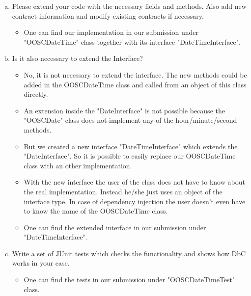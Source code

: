 \documentclass[a4paper,12pt,oneside]{scrreprt}
\begin{document}
\begin{enumerate}[a)]
	\item Please extend your code with the necessary fields and methods. Also add new contract information and modify existing contracts if necessary.

		\begin{itemize}
			\item One can find our implementation in our submission under "OOSCDateTime" class together with its interface "DateTimeInterface".
		\end{itemize}

	\item Is it also necessary to extend the Interface?

		\begin{itemize}
            \item No, it is not necessary to extend the interface. The new methods could be added in the OOSCDateTime class and called from an object of this class directly.
            \item An extension inside the "DateInterface" is not possible because the "OOSCDate" class does not implement any of the hour/minute/second-methods.
			\item But we created a new interface "DateTimeInterface" which extends the "DateInterface". So it is possible to easily replace our OOSCDateTime class with an other implementation. 
            \item With the new interface the user of the class does not have to know about the real implementation. Instead he/she just uses an object of the interface type. In case of dependency injection the user doesn't even have to know the name of the OOSCDateTime class.
			\item One can find the extended interface in our submission under "DateTimeInterface".
		\end{itemize}

	\item Write a set of JUnit tests which checks the functionality and shows how DbC works in your case.

		\begin{itemize}
			\item One can find the tests in our submission under "OOSCDateTimeTest" class.
		\end{itemize}

\end{enumerate}
\end{document}
